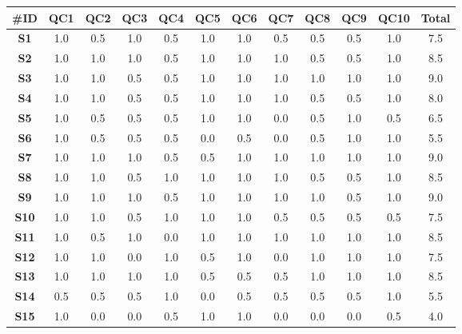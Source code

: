 \begin{table}
    \centering
    \scriptsize
    
    \setlength\tabcolsep{2pt}
    \def\arraystretch{1.4}%
    \begin{tabular}{|c|c|c|c|c|c|c|c|c|c|c||c|} 
    
    \hline
    \textbf{\#ID} & \textbf{QC1} & \textbf{QC2} & \textbf{QC3} & \textbf{QC4} & \textbf{QC5} & \textbf{QC6} & \textbf{QC7} & \textbf{QC8} & \textbf{QC9} & \textbf{QC10} & \textbf{Total} \\
    \hline
    
    \textbf{S1} & 1.0 & 0.5 & 1.0 & 0.5 & 1.0 & 1.0 & 0.5 & 0.5 & 0.5 & 1.0 & 7.5 \\ \hline
    \textbf{S2} & 1.0 & 1.0 & 1.0 & 0.5 & 1.0 & 1.0 & 1.0 & 0.5 & 0.5 & 1.0 & 8.5 \\ \hline
    \textbf{S3} & 1.0 & 1.0 & 0.5 & 0.5 & 1.0 & 1.0 & 1.0 & 1.0 & 1.0 & 1.0 & 9.0 \\ \hline
    \textbf{S4} & 1.0 & 1.0 & 0.5 & 0.5 & 1.0 & 1.0 & 1.0 & 0.5 & 0.5 & 1.0 & 8.0 \\ \hline
    \textbf{S5} & 1.0 & 0.5 & 0.5 & 0.5 & 1.0 & 1.0 & 0.0 & 0.5 & 1.0 & 0.5 & 6.5 \\ \hline
    \textbf{S6} & 1.0 & 0.5 & 0.5 & 0.5 & 0.0 & 0.5 & 0.0 & 0.5 & 1.0 & 1.0 & 5.5 \\ \hline
    \textbf{S7} & 1.0 & 1.0 & 1.0 & 0.5 & 0.5 & 1.0 & 1.0 & 1.0 & 1.0 & 1.0 & 9.0 \\ \hline
    \textbf{S8} & 1.0 & 1.0 & 0.5 & 1.0 & 1.0 & 1.0 & 1.0 & 0.5 & 0.5 & 1.0 & 8.5 \\ \hline
    \textbf{S9} & 1.0 & 1.0 & 1.0 & 0.5 & 1.0 & 1.0 & 1.0 & 1.0 & 0.5 & 1.0 & 9.0 \\ \hline
    \textbf{S10} & 1.0 & 1.0 & 0.5 & 1.0 & 1.0 & 1.0 & 0.5 & 0.5 & 0.5 & 0.5 & 7.5 \\ \hline
    \textbf{S11} & 1.0 & 0.5 & 1.0 & 0.0 & 1.0 & 1.0 & 1.0 & 1.0 & 1.0 & 1.0 & 8.5 \\ \hline
    \textbf{S12} & 1.0 & 1.0 & 0.0 & 1.0 & 0.5 & 1.0 & 0.0 & 1.0 & 1.0 & 1.0 & 7.5 \\ \hline
    \textbf{S13} & 1.0 & 1.0 & 1.0 & 1.0 & 0.5 & 0.5 & 0.5 & 1.0 & 1.0 & 1.0 & 8.5 \\ \hline
    \textbf{S14} & 0.5 & 0.5 & 0.5 & 1.0 & 0.0 & 0.5 & 0.5 & 0.5 & 0.5 & 1.0 & 5.5 \\ \hline
    \textbf{S15} & 1.0 & 0.0 & 0.0 & 0.5 & 1.0 & 1.0 & 0.0 & 0.0 & 0.0 & 0.5 & 4.0 \\ \hline

\end{tabular}
\end{table}

